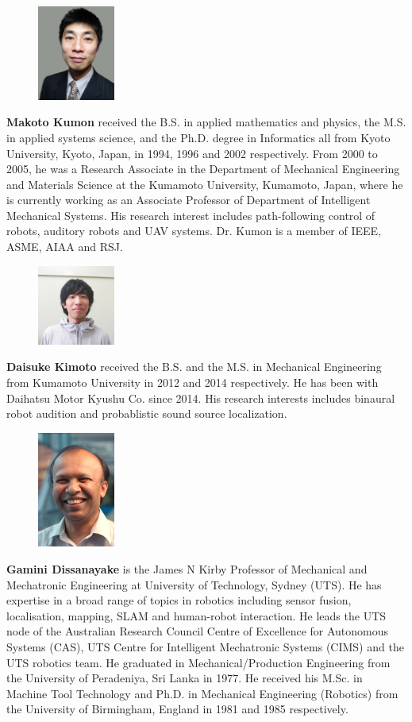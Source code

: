 \begin{figure}[H]
  \centering
    \includegraphics[width=1in,clip,keepaspectratio]{kumon.jpg}
\end{figure}
\noindent\textbf{Makoto Kumon} received the B.S. in applied mathematics and physics, the M.S. in applied systems science, and the Ph.D. degree in Informatics all from Kyoto University, Kyoto, Japan, in 1994, 1996 and 2002 respectively. From 2000 to 2005, he was a Research Associate in the Department of Mechanical Engineering and Materials Science at the Kumamoto University, Kumamoto, Japan, where he is currently working as an Associate Professor of Department of Intelligent Mechanical Systems. His research interest includes path-following control of robots, auditory robots and UAV systems. Dr. Kumon is a member of IEEE, ASME, AIAA and RSJ. 
\begin{figure}[H]
  \centering
 \includegraphics[width=1in,clip,keepaspectratio]{kimoto.jpg}
\end{figure}
\noindent\textbf{Daisuke Kimoto} received the B.S. and the M.S. in Mechanical Engineering from Kumamoto University in 2012 and 2014 respectively. He has been with Daihatsu Motor Kyushu Co. since 2014. His research interests includes binaural robot audition and probablistic sound source localization.
\begin{figure}[H]
  \centering
 \includegraphics[width=1in,clip,keepaspectratio]{dissanayake.jpg}
\end{figure}
\noindent\textbf{Gamini Dissanayake} is the James N Kirby Professor of Mechanical and Mechatronic Engineering at University of Technology, Sydney (UTS). He has expertise in a broad range of topics in robotics including sensor fusion, localisation, mapping, SLAM and human-robot interaction. He leads the UTS node of the Australian Research Council Centre of Excellence for Autonomous Systems (CAS), UTS Centre for Intelligent Mechatronic Systems (CIMS) and the UTS robotics team. He graduated in Mechanical/Production Engineering from the University of Peradeniya, Sri Lanka in 1977. He received his M.Sc. in Machine Tool Technology and Ph.D. in Mechanical Engineering (Robotics) from the University of Birmingham, England in 1981 and 1985 respectively.

 


